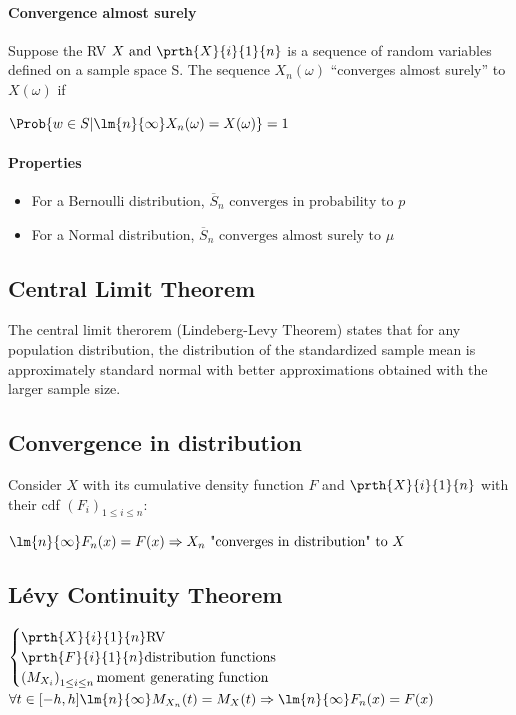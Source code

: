 \paragraph{Convergence almost surely}
Suppose the RV $X\text{ and }\prth{X}{i}{1}{n}$ is a sequence of random variables defined
on a sample space S. The sequence $X_{n}(\omega)$ ``converges almost surely'' to $X(\omega)$ if
\begin{center}
	$\Prob{w\in S|\lm{n}{\infty}X_{n}(\omega)=X(\omega)}=1$
\end{center}
\paragraph{Properties}
\begin{itemize}
	\item For a Bernoulli distribution, $\overline{S}_{n}\text{ converges in probability to }p$
	\item For a Normal distribution, $\overline{S}_{n}\text{ converges almost surely to }\mu$
\end{itemize}


\subsection{Central Limit Theorem}
The central limit therorem (Lindeberg-Levy Theorem) states that for any
population distribution, the distribution of the standardized sample mean
is approximately standard normal with better approximations obtained with
the larger sample size.
\begin{center}
\end{center}
\subsection{Convergence in distribution}
Consider $X$ with its cumulative density function $F$ and $\prth{X}{i}{1}{n}$ with their 
cdf $\left( F_{i} \right)_{1\leq i\leq n}$:
\begin{center}
	$\lm{n}{\infty}F_{n}(x)=F(x)\Rightarrow X_{n}\text{ "converges in distribution" to }X$
\end{center}
\subsection{Lévy Continuity Theorem}
\begin{center}
	$
	\begin{cases}	
		\prth{X}{i}{1}{n}\text{RV}\\
		\prth{F}{i}{1}{n}\text{distribution functions}\\
		\left( M_{X_{i}} \right)_{1\leq i\leq n}\text{moment generating function}
	\end{cases}$
	$\forall t\in [-h,h]\lm{n}{\infty}M_{X_{n}}(t)=M_{X}(t)\Rightarrow
	\lm{n}{\infty}F_{n}(x)=F(x)
	$
\end{center}

